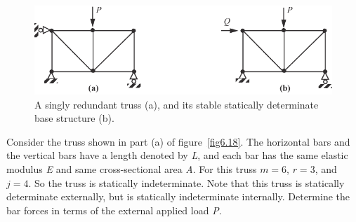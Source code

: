\documentclass{AeroStructure-ERJohnson}
\begin{document}
\begin{figure}
\centerline{\includegraphics{Figure_6-17.pdf}}
\caption{A singly redundant truss (a), and its stable statically determinate base structure (b).}\label{fig6.17}
\end{figure}

\begin{example}\label{ex6.8}Consider the truss shown in part (a) of figure~\ref{fig6.18}. The horizontal bars and the vertical bars have a length denoted by \textit{L}, and each bar has the same elastic modulus \textit{E} and same cross-sectional area \textit{A}. For this truss $m = 6$, $r = 3$, and $j= 4$. So the truss is statically indeterminate. Note that this truss is statically determinate externally, but is statically indeterminate internally. Determine the bar forces in terms of the external applied load \textit{P}.

{\caption{(a) Statically indeterminate truss. (b) Statically determinant base structure with bar
2-4 replaced by forces $\textbf{\textit{F}}_{\textbf{1}}$ and $\textbf{\textit{F}}_{\textbf{2}}$. (c) Bar 2-4 subject to equal and opposite forces.\label{fig6.18}}}


\end{example}
\end{document}
